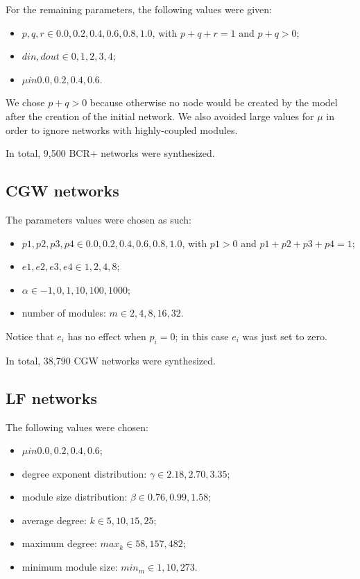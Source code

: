 For the remaining parameters, the following values were given:

\begin{itemize}
\item $p, q, r \in {0.0, 0.2, 0.4, 0.6, 0.8, 1.0}$, with $p + q + r = 1$ and $p
+ q > 0$;
\item $din, dout \in {0, 1, 2, 3, 4}$;
\item $\mu in {0.0, 0.2, 0.4, 0.6}$.
\end{itemize}

We chose $p + q > 0$ because otherwise no node would be created by the model
after the creation of the initial network. We also avoided large values for
$\mu$ in order to ignore networks with highly-coupled modules. 

In total, 9,500 BCR+ networks were synthesized.

\subsection{CGW networks}

The parameters values were chosen as such:

\begin{itemize}
\item $p1, p2, p3, p4 \in {0.0, 0.2, 0.4, 0.6, 0.8, 1.0}$, with $p1 > 0$ and $p1
  + p2 + p3 + p4 = 1$;
\item $e1, e2, e3, e4 \in {1, 2, 4, 8}$;
\item $\alpha \in {-1, 0, 1, 10, 100, 1000}$;
\item number of modules: $m \in {2, 4, 8, 16, 32}$.
\end{itemize}

Notice that $e_i$ has no effect when $p_i = 0$; in this case $e_i$ was just set
to zero.

In total, 38,790 CGW networks were synthesized.

\subsection{LF networks}

The following values were chosen:

\begin{itemize}
  \item $\mu in {0.0, 0.2, 0.4, 0.6}$;
  \item degree exponent distribution: $\gamma \in {2.18, 2.70, 3.35}$;
  \item module size distribution: $\beta \in {0.76, 0.99, 1.58}$;
  \item average degree: $k \in {5, 10, 15, 25}$;
  \item maximum degree: $max_k \in {58, 157, 482}$;
  \item minimum module size: $min_m \in {1, 10, 273}$.
\end{itemize}

